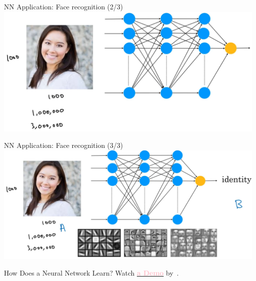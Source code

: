 \documentclass[pdf]{beamer}
\theoremstyle{mystyle}
\begin{document}
\begin{frame}{NN Application: Face recognition (2/3)}
		\centering
		\includegraphics[scale=.25]{face-recognition-intro-2}
\end{frame}

\begin{frame}{NN Application: Face recognition (3/3)}
		\centering
		\includegraphics[scale=.225]{face-recognition-intro-3}
\end{frame}

\begin{frame}{How Does a Neural Network Learn?}
	Watch \href{https://phiresky.github.io/neural-network-demo/}{\textcolor{pink}{\textbf{a Demo}}} by~\citet{phiresky2017neuralnetwork}.
\end{frame}
\end{document}
